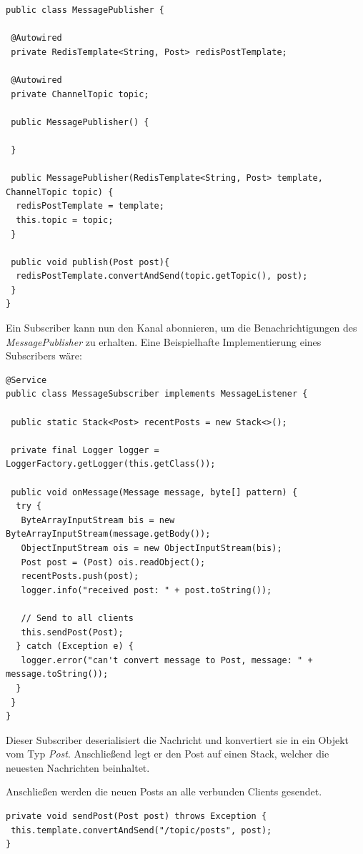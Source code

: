 \documentclass[
    a4paper
]{scrreprt}
\begin{document}
	\begin{lstlisting}
public class MessagePublisher {

 @Autowired
 private RedisTemplate<String, Post> redisPostTemplate;

 @Autowired
 private ChannelTopic topic;

 public MessagePublisher() {

 }

 public MessagePublisher(RedisTemplate<String, Post> template, ChannelTopic topic) {
  redisPostTemplate = template;
  this.topic = topic; 
 }

 public void publish(Post post){
  redisPostTemplate.convertAndSend(topic.getTopic(), post);
 }
}
	\end{lstlisting}
	Ein Subscriber kann nun den Kanal abonnieren, um die Benachrichtigungen des \textit{MessagePublisher} zu erhalten. Eine Beispielhafte Implementierung eines Subscribers wäre:
	\begin{lstlisting}
@Service
public class MessageSubscriber implements MessageListener {

 public static Stack<Post> recentPosts = new Stack<>();

 private final Logger logger = LoggerFactory.getLogger(this.getClass());

 public void onMessage(Message message, byte[] pattern) {
  try {
   ByteArrayInputStream bis = new ByteArrayInputStream(message.getBody());
   ObjectInputStream ois = new ObjectInputStream(bis);
   Post post = (Post) ois.readObject();
   recentPosts.push(post);
   logger.info("received post: " + post.toString());
   
   // Send to all clients
   this.sendPost(Post);
  } catch (Exception e) {
   logger.error("can't convert message to Post, message: " + message.toString());
  }
 }
}
	\end{lstlisting}
	Dieser Subscriber deserialisiert die Nachricht und konvertiert sie in ein Objekt vom Typ \textit{Post}. Anschließend legt er den Post auf einen Stack, welcher die neuesten Nachrichten beinhaltet. 
	
	Anschließen werden die neuen Posts an alle verbunden Clients gesendet.
	\begin{lstlisting}
private void sendPost(Post post) throws Exception {
 this.template.convertAndSend("/topic/posts", post);
}
	\end{lstlisting}
\end{document}
